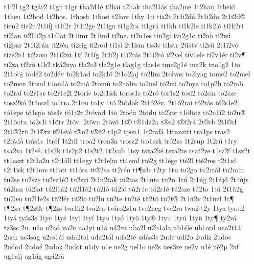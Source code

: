 {t1f2l
tg2
tg^^e1r2
t1gn
t1gr
tha2d1^^e9
t2hai
t2hak
tha2l1^^e1s
tha2me
1t2hau
1theid
1theu
1t2hod
1t2hos.
1thosb
1thosi
t2hov
1thy
1ti
tia2t
2t1i2d^^e9
2t1i2do
2t1i2d^^ae
tien2
tie2r
2t1ifj
ti1f2r
2t1i2ge
2t1ign
ti1g2ra
ti1gr^^e1
ti1kh
ti1k2le
ti1k2l^^f3
ti1k2ri
ti2lan
ti2l1i2p
t1illat
2t1imr
2t1ind
ti2ne.
ti2n1es
tin2gi
tin2g1o
ti2n^^f6
ti2n^^fa
ti2par
2t1i2r^^e1n
ti2r^^e9n
ti2rig
ti2rod
ti1sl
2t1ism
tis3s
ti1str
2tistv
ti2s^^fc
2t1i2v^^f3
tize2n1
ti2zom
2t1i2z^^fc
1t^^ed
2t1^^edg
2t1^^ed2j
t1^^ed2r^^e1s
2t1^^ed2r^^f3
t^^ed2vel
t^^edv1ele
t^^ed2v1^^e9r
t^^ed2v^^b6
t^^ed2za
t^^ed2z^^f3
t1k2
tk^^e12nya
tla2c3
tla2g1e
tlag1g
tlas1s
tme2g1^^e9
tna2k
tno1g2
1to
2t1obj
tod^^e92
to2d^^e9v
to2k1ad
to2k1^^f6
2t1o2laj
to2lim
2tolvas
to2lyag
tome2
to2mel
to2men
2toml
t1oml^^e1
to2m^^f3
2tom^^fa
to2nalm
to2nel
to2n^^fc
to2nye
to1p2h
to2rab
to2ral
to2r1as
to2r1e2l
2torie
to2r1isk
toros1s
to2r^^f3
tor1s2
tosi2
to2sin
to2sze
tosz2k^^f3
2t1oszl
to1tra
2t1ou
to1y
1t^^f3
2t^^f3dok
2t1^^f32^^e9v.
2t1^^f32rai
t^^f32r^^e1s
t^^f32s1e2
t^^f31spe
t^^f31spo
t^^f3s3s
t^^f31t2r
2t^^f3vod
1t^^f6
2t^^f6dn
2t^^f6d^^fc
t^^f62k^^f6r
t1^^f6lt^^f6z
t^^f62n1^^ed2
t^^f62n^^ae
2t1^^f6ntu
t^^f62s1i
t1^^f6tr
2t^^f6v.
2t^^f6vn
2t^^f6v^^f6
1t^^ae
t^^ae1dz2n
t^^aee2
t^^aei2r^^e1
2t^^aerb
2t1^^aerl
2t1^^ae2r^^fc
2t1^^aerz
t^^ae1st^^e9
t^^aeu2
t^^ae^^fc2
t1p2
tpen1
1t2raf^^e1
1tranziti
tra1ps
tras2
t2r^^e1d^^e1
tr^^e1s1s
1tr^^e9f
1t2ril
troa2
tron3n
trosz2
tro1szk
tr^^f32zs
1t2rup
1t2r^^fc
t1ry
tsa2va
1t2s^^e9.
t1s2k
t1s2p2
t1s2t2
1t2sub
1tsy
tsza2k^^e9
tsza2te
tsz^^e12ze
t1sz2f
t1sz2t
tt1aszt
t2t1a2u
t2t1^^e1ll
tt1egy
t2t1elm
tt1eml
tt^^e92g
tt1^^e9ge
tt^^e92l
tt^^e92res
t2t1id
t2t1isk
t2t1ors
tt1ott
tt1^^f3ra
tt^^ae2sa
tt2r^^e9n
tt^^b6z3s
t2ty
1tu
tu2go
tu2m^^e1l
tu2min
tu2se
tu2sze
tu2sz1^^e92
tu2szi
2t1u2tak
tu2tas
2t1utc
tu2u
1t^^fa
2t1^^fag
2t1^^fajd
2t1^^fajs
t^^fa2lan
t^^fa2lat
t^^fa2l1^^e12
t^^fa2l1^^e92
t^^fa2l^^f3
t^^fa2l^^f6
t^^fa2r1e
t^^fa2r1^^e9
t^^fa2sze
t^^fa2to
1t^^fc
2t1^^fc2g
t^^fc2len
t^^fc2l1e2s
t^^fc2l^^e9r
t^^fc2lo
t^^fc2l^^fc
t^^fc2te
t^^fc2t^^e9
t^^fc2t^^f6
t^^fc2t^^ae
2t1^^fc2v
2t1^^fczl
1t^^b6
t^^b62za
t^^b62z^^aer
t^^b62zs
tva1k2
tva2ra
tv^^e1ro2s1u
tve2neg
tve2ra
twa2
t2y
1tya
tyau2
1ty^^e1
ty^^e1s3s
1tye
1ty^^e9
1tyi
1ty^^ed
1tyo
1ty^^f3
1ty^^f6
1ty^^ae
1tyu
1ty^^fa
1ty^^fc
1ty^^b6
ty2v^^e1
tz3sc
2u.
u1a
u2ad
ua2e
ua1yi
u1^^e1
u^^e12ru
uba2l
u2b1ala
ub1^^e9le
ub1ord
uca2t1^^e1
2uch
uc3s^^e1g
u2cs1^^e1l
uda2tal
uda2t^^e1l
uda2te
ud^^e1s3s
2ude
udi2o
2udiz
2udoc
2udod
2udo^^e9
2udok
2udot
u1dy
u1e
ue2g
uel1o
ue2s
ues3ze
ue2v
u1^^e9
u^^e92p
2uf
ug1alj
ug1^^e1g
ug^^e12r^^e1
}
